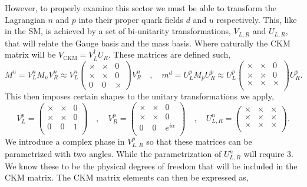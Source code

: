 However, to properly examine this sector we must be able to transform the Lagrangian $n$ and $p$ into their proper quark fields $d$ and $u$ respectively. 
%
This, like in the SM, is achieved by a set of bi-unitarity transformations, $V_{L,R}$ and $U_{L,R}$, that will relate the Gauge basis and the mass basis. Where naturally the CKM matrix will be $V_{\text{CKM}} = V_L^\dagger U_R$. These matrices are defined such, 
%
\begin{equation}
M^u = V_L^n M_n V_R^n \approx V_L^n \begin{pmatrix}
\times & \times & 0 \\
\times & \times & 0 \\
0 & 0 & \times 
\end{pmatrix}  V_R^n  \quad , \quad 
m^d = U_L^p  M_p U_R^p \approx U_L^p \begin{pmatrix}
\times & \times & 0 \\
\times & \times & 0 \\
\times & \times & \times \\ \end{pmatrix} U_R^p . 
\end{equation}
This then imposes certain shapes to the unitary transformations we apply,
\begin{equation}
V^{p}_{L} = \begin{pmatrix}
\times & \times & 0 \\ 
\times & \times & 0 \\
0 & 0 & 1 \\ 
\end{pmatrix} \quad , \quad   V^{p}_{R} = \begin{pmatrix}
\times & \times & 0 \\ 
\times & \times & 0 \\
0 & 0 & e^{i\alpha}  \\ 
\end{pmatrix}  \quad , \quad 
U^{n}_{L,R} = 
\begin{pmatrix}
\times & \times & \times \\ 
\times & \times & \times \\
\times & \times & \times \\
\end{pmatrix} .
\end{equation}
We introduce a complex phase in $V^p_{L,R}$ so that these matrices can be parametrized with two angles. While the parametrization of $U^n_{L,R}$ will require 3. We know these to be the physical degrees of freedom that will be included in the CKM matrix. The CKM matrix elements can then be expressed as, 
